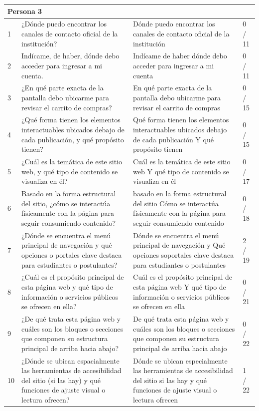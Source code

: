 \begin{longtable}{|p{0.5cm}|p{5.7cm}|p{5.7cm}|p{1.5cm}|}
    \multicolumn{4}{|l|}{\textbf{Persona 3}} \\
    \hline
    1 & ¿Dónde puedo encontrar los canales de contacto oficial de la institución? & Dónde puedo encontrar los canales de contacto oficial de la institución & 0 / 11 \\
    \hline
    2 & Indícame, de haber, dónde debo acceder para ingresar a mi cuenta. & Indícame de haber dónde debo acceder para ingresar a mi cuenta & 0 / 11 \\
    \hline
    3 & ¿En qué parte exacta de la pantalla debo ubicarme para revisar el carrito de compras? & En qué parte exacta de la pantalla debo ubicarme para revisar el carrito de compras & 0 / 15 \\
    \hline
    4 & ¿Qué forma tienen los elementos interactuables ubicados debajo de cada publicación, y qué propósito tienen? & Qué forma tienen los elementos interactuables ubicados debajo de cada publicación Y qué propósito tienen & 0 / 15 \\
    \hline
    5 & ¿Cuál es la temática de este sitio web, y qué tipo de contenido se visualiza en él? & Cuál es la temática de este sitio web Y qué tipo de contenido se visualiza en él & 0 / 17 \\
    \hline
    6 & Basado en la forma estructural del sitio, ¿cómo se interactúa físicamente con la página para seguir consumiendo contenido? & basado en la forma estructural del sitio Cómo se interactúa físicamente con la página para seguir consumiendo contenido & 0 / 18 \\
    \hline
    7 & ¿Dónde se encuentra el menú principal de navegación y qué opciones o portales clave destaca para estudiantes o postulantes? & Dónde se encuentra el menú principal de navegación y Qué opciones soportales clave destaca para estudiantes o postulantes & 2 / 19 \\
    \hline
    8 & ¿Cuál es el propósito principal de esta página web y qué tipo de información o servicios públicos se ofrecen en ella? & Cuál es el propósito principal de esta página web Y qué tipo de información o servicios públicos se ofrecen en ella & 0 / 21 \\
    \hline
    9 & ¿De qué trata esta página web y cuáles son los bloques o secciones que componen su estructura principal de arriba hacia abajo? & De qué trata esta página web y cuáles son los bloques o secciones que componen su estructura principal de arriba hacia abajo & 0 / 22 \\
    \hline
    10 & ¿Dónde se ubican espacialmente las herramientas de accesibilidad del sitio (si las hay) y qué funciones de ajuste visual o lectura ofrecen? & Dónde se ubican especialmente las herramientas de accesibilidad del sitio si las hay y qué funciones de ajuste visual o lectura ofrecen & 1 / 22 \\
    \hline


\end{longtable}
